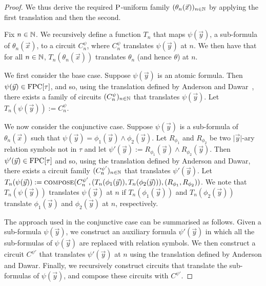 \documentclass[../paper.tex]{subfiles}
\begin{document}
\begin{proof}
  We thus derive the required $\mathrm{P}$-uniform family $(\theta_n(\vec{x}))_{n \in
    \mathbb{N}}$ by applying the first translation and then the second.

  Fix $n \in \mathbb{N}$. We recursively define a function $T_n$ that maps $\psi
  (\vec{y})$, a sub-formula of $\theta_n(\vec{x})$, to a circuit $C^{\psi}_n$,
  where $C^{\psi}_n$ translates $\psi(\vec{y})$ at $n$. We then have that for
  all $n \in \mathbb{N}$, $T_n(\theta_n(\vec{x}))$ translates $\theta_n$ (and hence
  $\theta$) at $n$.

  We first consider the base case. Suppose $\psi(\vec{y})$ is an atomic formula.
  Then $\psi(\vec{y}) \in \text{\upshape FPC}[\tau]$, and so, using the translation defined by
  Anderson and Dawar~\cite{AndersonD17}, there exists a family of circuits
  $(C^{\psi}_n)_{n \in \mathbb{N}}$ that translates $\psi(\vec{y})$. Let
  $T_n(\psi(\vec{y})) := C^{\psi}_n$.

  We now consider the conjunctive case. Suppose $\psi(\vec{y})$ is a sub-formula
  of $\theta_n(\vec{x})$ such that $\psi (\vec{y}) = \phi_1(\vec{y}) \land
  \phi_2(\vec{y})$. Let $R_{\phi_1}$ and $R_{\phi_2}$ be two $\vert \vec{y}
  \vert$-ary relation symbols not in $\tau$ and let $\psi' (\vec{y}) :=
  R_{\phi_1}(\vec{y}) \land R_{\phi_2}(\vec{y})$. Then $\psi'(\vec{y}) \in
  \text{\upshape FPC}[\tau]$ and so, using the translation defined by Anderson and Dawar, there
  exists a circuit family $(C^{\psi'}_n)_{n \in \mathbb{N}}$ that translates
  $\psi'(\vec{y})$. Let $T_n(\psi (\vec{y})) := {\normalfont\textsc{compose}}(C^{\psi'}_n, (
  T_n(\phi_1(\vec{y})), T_n(\phi_2(\vec{y}))), (R_{\phi_1}, R_{\phi_2}))$. We
  note that $T_n(\psi(\vec{y}))$ translates $\psi (\vec{y})$ at $n$ if
  $T_n(\phi_1 (\vec{y}))$ and $T_n(\phi_2(\vec{y}))$ translate $\phi_1(\vec{y})$
  and $\phi_2(\vec{y})$ at $n$, respectively.

  
  The approach used in the conjunctive case can be summarised as follows. Given
  a sub-formula $\psi (\vec{y})$, we construct an auxiliary formula
  $\psi'(\vec{y})$ in which all the sub-formulas of $\psi(\vec{y})$ are replaced
  with relation symbols. We then construct a circuit $C^{\psi'}$ that translates
  $\psi'(\vec{y})$ at $n$ using the translation defined by Anderson and Dawar.
  Finally, we recursively construct circuits that translate the sub-formulas of
  $\psi(\vec{y})$, and compose these circuits with $C^{\psi'}$.
  

\end{proof}
\end{document}
